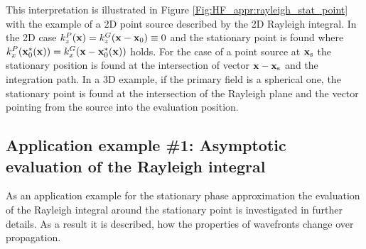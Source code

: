 This interpretation is illustrated in Figure \ref{Fig:HF_appr:rayleigh_stat_point} with the example of a 2D point source described by the 2D Rayleigh integral.
In the 2D case $k_z^P(\mathbf{x}) = k_z^G(\mathbf{x}-\mathbf{x}_0) \equiv 0$ and the stationary point is found where $k_x^P(\mathbf{x}_0^*(\mathbf{x})) = k_x^G(\mathbf{x}-\mathbf{x}_0^*(\mathbf{x}))$ holds.
For the case of a point source at $\mathbf{x}_{\mathrm{s}}$ the stationary position is found at the intersection of vector $\mathbf{x}-\mathbf{x}_{\mathrm{s}}$ and the integration path.
In a 3D example, if the primary field is a spherical one, the stationary point is found at the intersection of the Rayleigh plane and the vector pointing from the source into the evaluation position.

\subsection*{Application example \#1: Asymptotic evaluation of the Rayleigh integral}
\label{Sec:HF:RayleighSPA}
As an application example for the stationary phase approximation the evaluation of the Rayleigh integral around the stationary point is investigated in further details.
As a result it is described, how the properties of wavefronts change over propagation.

